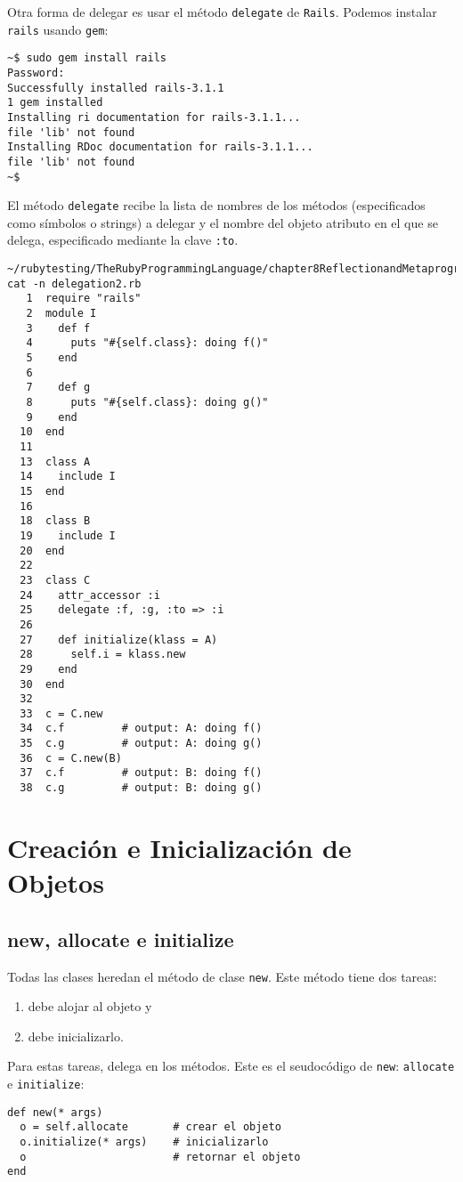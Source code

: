 Otra forma de delegar es usar el método \verb|delegate| de \verb|Rails|.
Podemos instalar \verb|rails| usando \verb|gem|:
\begin{verbatim}
~$ sudo gem install rails
Password:
Successfully installed rails-3.1.1
1 gem installed
Installing ri documentation for rails-3.1.1...
file 'lib' not found
Installing RDoc documentation for rails-3.1.1...
file 'lib' not found
~$ 
\end{verbatim}

El método \verb|delegate| recibe la lista de nombres de los métodos (especificados como
símbolos o strings) a delegar
y el nombre del objeto atributo en el que se delega, especificado mediante
la clave \verb|:to|.

\begin{verbatim}
~/rubytesting/TheRubyProgrammingLanguage/chapter8ReflectionandMetaprogramming$ cat -n delegation2.rb 
   1  require "rails"
   2  module I
   3    def f
   4      puts "#{self.class}: doing f()"
   5    end
   6   
   7    def g
   8      puts "#{self.class}: doing g()"
   9    end
  10  end
  11   
  13  class A
  14    include I
  15  end
  16   
  18  class B
  19    include I
  20  end
  22   
  23  class C
  24    attr_accessor :i
  25    delegate :f, :g, :to => :i
  26   
  27    def initialize(klass = A)
  28      self.i = klass.new
  29    end
  30  end
  32   
  33  c = C.new
  34  c.f         # output: A: doing f()
  35  c.g         # output: A: doing g()
  36  c = C.new(B)
  37  c.f         # output: B: doing f()
  38  c.g         # output: B: doing g()
\end{verbatim}

\section{Creación e Inicialización de Objetos}

\subsection{new, allocate e initialize}
Todas las clases heredan el método de clase \verb|new|.
Este método tiene dos tareas: 

\begin{enumerate}
\item
debe alojar al objeto y 
\item
debe inicializarlo.
\end{enumerate}
Para estas tareas, delega en los métodos.
Este es el seudocódigo de \verb|new|: 
\verb|allocate| e \verb|initialize|:
\begin{verbatim}
def new(* args)
  o = self.allocate       # crear el objeto
  o.initialize(* args)    # inicializarlo
  o                       # retornar el objeto
end
\end{verbatim}

